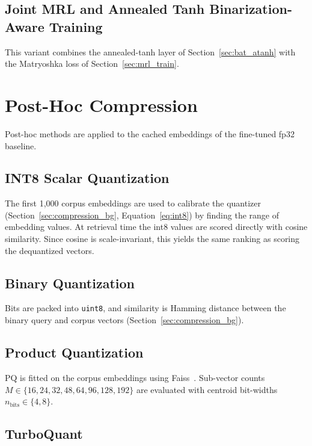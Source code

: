 \subsection{Joint MRL and Annealed Tanh Binarization-Aware Training}
\label{sec:mrl_atanh}

This variant combines the annealed-tanh layer of Section~\ref{sec:bat_atanh}
with the Matryoshka loss of Section~\ref{sec:mrl_train}.


\section{Post-Hoc Compression}
\label{sec:posthoc}

Post-hoc methods are applied to the cached embeddings of the fine-tuned fp32
baseline.

\subsection{INT8 Scalar Quantization}

The first 1{,}000 corpus embeddings are used to calibrate the quantizer
(Section~\ref{sec:compression_bg}, Equation~\ref{eq:int8}) by finding the
range of embedding values. At retrieval time the int8 values are scored
directly with cosine similarity. Since cosine is scale-invariant, this
yields the same ranking as scoring the dequantized vectors.

\subsection{Binary Quantization}

Bits are packed into \texttt{uint8}, and similarity is Hamming distance
between the binary query and corpus vectors
(Section~\ref{sec:compression_bg}).

\subsection{Product Quantization}

PQ is fitted on the corpus embeddings using Faiss~\cite{douze2024faiss}.
Sub-vector counts $M \in \{16, 24, 32, 48, 64, 96, 128, 192\}$ are evaluated
with centroid bit-widths $n_{\text{bits}} \in \{4, 8\}$.

\subsection{TurboQuant}

